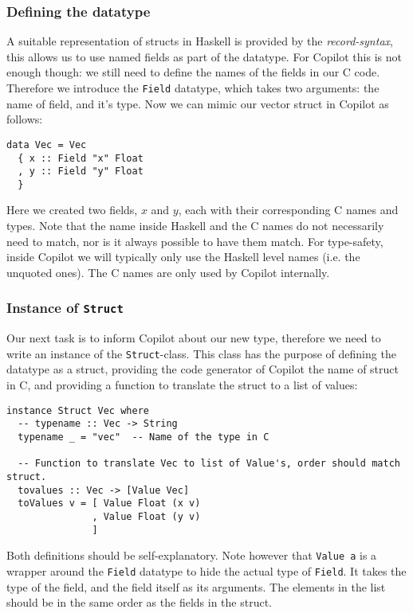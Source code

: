 \subsubsection*{Defining the datatype}
A suitable representation of structs in Haskell is provided by the
\emph{record-syntax}, this allows us to use named fields as part of the
datatype. For Copilot this is not enough though: we still need to define the
names of the fields in our C code. Therefore we introduce the  \texttt{Field}
datatype, which takes two arguments: the name of field, and it's type. Now we
can mimic our vector struct in Copilot as follows:
\begin{lstlisting}[language=Copilot]
data Vec = Vec
  { x :: Field "x" Float
  , y :: Field "y" Float
  }
\end{lstlisting}
Here we created two fields, $x$ and $y$, each with their corresponding C names
and types. Note that the name inside Haskell and the C names do not necessarily
need to match, nor is it always possible to have them match. For type-safety,
inside Copilot we will typically only use the Haskell level names (i.e. the
unquoted ones). The C names are only used by Copilot internally.


\subsubsection*{Instance of \texttt{Struct}}
Our next task is to inform Copilot about our new type, therefore we need to
write an instance of the \texttt{Struct}-class. This class has the purpose of
defining the datatype as a struct, providing the code generator of Copilot the
name of struct in C, and providing a function to translate the struct to a list
of values:
\begin{lstlisting}[language=Copilot]
instance Struct Vec where
  -- typename :: Vec -> String
  typename _ = "vec"  -- Name of the type in C

  -- Function to translate Vec to list of Value's, order should match struct.
  tovalues :: Vec -> [Value Vec]
  toValues v = [ Value Float (x v)
               , Value Float (y v)
               ]
\end{lstlisting}
Both definitions should be self-explanatory. Note however that
\texttt{Value a} is a wrapper around the \texttt{Field} datatype to hide the
actual type of \texttt{Field}. It takes the type of the field, and the field
itself as its arguments. The elements in the list should be in the same order
as the fields in the struct.

